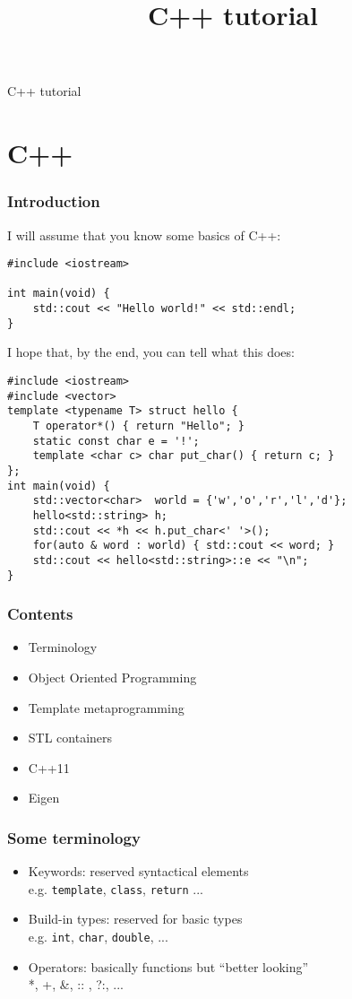 \documentclass{beamer}
\title{C++ tutorial}
\newcommand{\code}[1]{{\color{cgreen}\texttt{#1}}}
\begin{document}
\begin{frame}
 \begin{center}
  \Huge C++ tutorial
 \end{center}
\end{frame}

\section{C++}

\begin{frame}
 \frametitle{Introduction}
 I will assume that you know some basics of C++:
 \begin{lstlisting}
#include <iostream>

int main(void) {
    std::cout << "Hello world!" << std::endl;
}
 \end{lstlisting}
 \framebreak
 I hope that, by the end, you can tell what this does:
 \begin{lstlisting}
#include <iostream>
#include <vector>
template <typename T> struct hello {
    T operator*() { return "Hello"; }
    static const char e = '!';
    template <char c> char put_char() { return c; }
};
int main(void) {
    std::vector<char>  world = {'w','o','r','l','d'};
    hello<std::string> h;
    std::cout << *h << h.put_char<' '>();
    for(auto & word : world) { std::cout << word; }
    std::cout << hello<std::string>::e << "\n";
}
\end{lstlisting}
\end{frame}

\begin{frame}[fragile]
  \frametitle{Contents}
  \begin{itemize}
  \item Terminology
  \item Object Oriented Programming
  \item Template metaprogramming
  \item STL containers
  \item C++11
  \item Eigen
  \end{itemize}
\end{frame}

\begin{frame}[fragile]
 \frametitle{Some terminology}
 \begin{itemize}
  \item Keywords: reserved syntactical elements \\
  e.g. \code{template}, \code{class}, \code{return} ... 
  \item Build-in types: reserved for basic types \\
  e.g. \code{int}, \code{char}, \code{double}, ...
  \item Operators: basically functions but ``better looking'' \\
  *, +, \&, :: , ?:, ... 
 \end{itemize}
\end{frame}
\end{document}
